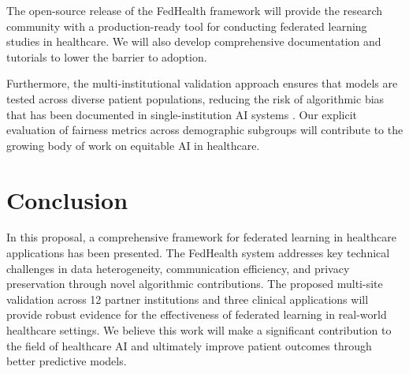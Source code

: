\documentclass[12pt,letterpaper]{article}
\begin{document}
The open-source release of the FedHealth framework will provide the research community with a production-ready tool for conducting federated learning studies in healthcare. We will also develop comprehensive documentation and tutorials to lower the barrier to adoption.

Furthermore, the multi-institutional validation approach ensures that models are tested across diverse patient populations, reducing the risk of algorithmic bias that has been documented in single-institution AI systems \citep{Obermeyer2019}. Our explicit evaluation of fairness metrics across demographic subgroups will contribute to the growing body of work on equitable AI in healthcare.

\section{Conclusion}

In this proposal, a comprehensive framework for federated learning in healthcare applications has been presented. The FedHealth system addresses key technical challenges in data heterogeneity, communication efficiency, and privacy preservation through novel algorithmic contributions. The proposed multi-site validation across 12 partner institutions and three clinical applications will provide robust evidence for the effectiveness of federated learning in real-world healthcare settings. We believe this work will make a significant contribution to the field of healthcare AI and ultimately improve patient outcomes through better predictive models.



\end{document}

